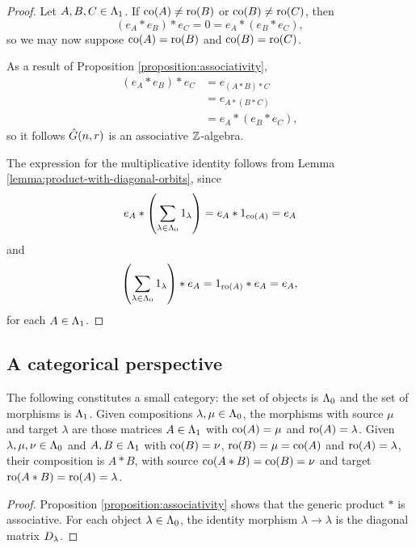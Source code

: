 \documentclass[a4paper, 11pt]{report}
\begin{document}
\begin{proof}
Let $A,B,C\in\Lambda_1{}$. If $\operatorname{co}(A)\neq\operatorname{ro}(B)$ or $\operatorname{co}(B)\neq\operatorname{ro}(C)$, then
\begin{equation*}
(e_A\ast e_B)\ast e_C = 0 = e_A\ast (e_B\ast e_C),
\end{equation*}
so we may now suppose $\operatorname{co}(A)=\operatorname{ro}(B)$ and $\operatorname{co}(B)=\operatorname{ro}(C)$.

As a result of Proposition \ref{proposition:associativity},
\begin{align*}
(e_A\ast e_B)\ast e_C &= e_{(A\ast B)\ast C}\\
&= e_{A\ast (B\ast C)}\\
&= e_A\ast (e_B\ast e_C),
\end{align*}
so it follows $\hat{G}(n,r)$ is an associative $\mathbb{Z}$-algebra.

The expression for the multiplicative identity follows from Lemma \ref{lemma:product-with-diagonal-orbits}, since
\begin{equation*}
e_A\ast \left(\sum_{\lambda\in\Lambda_0{}} 1_\lambda\right) = e_A\ast 1_{\operatorname{co}(A)} = e_A
\end{equation*}
and
\begin{equation*}
\left(\sum_{\lambda\in\Lambda_0{}} 1_\lambda\right)\ast e_A = 1_{\operatorname{ro}(A)}\ast e_A = e_A,
\end{equation*} 
for each $A\in\Lambda_1{}$.
\end{proof}

\subsection{A categorical perspective}

\begin{proposition}\label{prop:generic-category}
The following constitutes a small category: the set of objects is $\Lambda_0{}$ and the set of morphisms is $\Lambda_1{}$. Given compositions $\lambda,\mu\in\Lambda_0{}$, the morphisms with source $\mu$ and target $\lambda$ are those matrices $A\in\Lambda_1{}$ with $\operatorname{co}(A)=\mu$ and $\operatorname{ro}(A)=\lambda$. Given $\lambda,\mu,\nu\in\Lambda_0{}$ and $A,B\in\Lambda_1{}$ with $\operatorname{co}(B)=\nu$, $\operatorname{ro}(B)=\mu=\operatorname{co}(A)$ and $\operatorname{ro}(A)=\lambda$, their composition is $A\ast B$, with source $\operatorname{co}(A\ast B)=\operatorname{co}(B)=\nu$ and target $\operatorname{ro}(A\ast B)=\operatorname{ro}(A)=\lambda$.
\end{proposition}

\begin{proof}
Proposition \ref{proposition:associativity} shows that the generic product $\ast$ is associative. For each object $\lambda\in\Lambda_0{}$, the identity morphism $\lambda\to\lambda$ is the diagonal matrix $D_{\lambda}$.
\end{proof}
\end{document}
